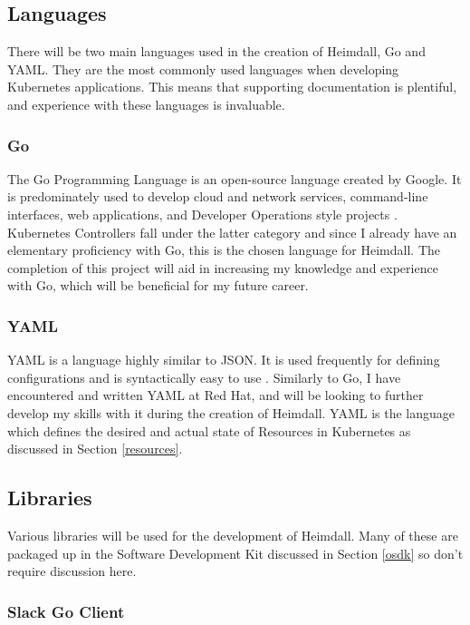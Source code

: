 \documentclass{article}
\begin{document}
\subsection{Languages}
There will be two main languages used in the creation of Heimdall, Go and YAML. They are the most commonly used languages when developing Kubernetes applications. This means that supporting documentation is plentiful, and experience with these languages is invaluable.  

\subsubsection{Go}

The Go Programming Language is an open-source language created by Google. It is predominately used to develop cloud and network services, command-line interfaces, web applications, and Developer Operations style projects \cite{go-dev}. Kubernetes Controllers fall under the latter category and since I already have an elementary proficiency with Go, this is the chosen language for Heimdall. The completion of this project will aid in increasing my knowledge and experience with Go, which will be beneficial for my future career.

\subsubsection{YAML}

YAML is a language highly similar to JSON. It is used frequently for defining configurations and is syntactically easy to use \cite{yaml-blog}. Similarly to Go, I have encountered and written YAML at Red Hat, and will be looking to further develop my skills with it during the creation of Heimdall. YAML is the language which defines the desired and actual state of Resources in Kubernetes as discussed in Section \ref{resources}. 

\subsection{Libraries}

Various libraries will be used for the development of Heimdall. Many of these are packaged up in the Software Development Kit discussed in Section \ref{osdk} so don't require discussion here. 


\subsubsection{Slack Go Client}
\end{document}
